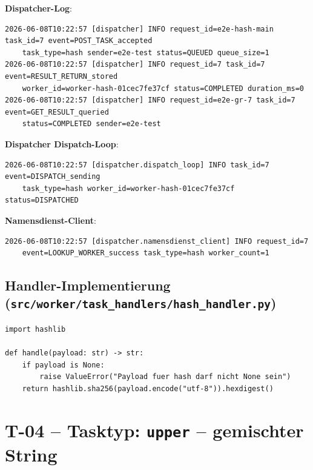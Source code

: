 \documentclass[a4paper,12pt]{article}
\begin{document}
\textbf{Dispatcher-Log}:
\begin{lstlisting}[style=log]
2026-06-08T10:22:57 [dispatcher] INFO request_id=e2e-hash-main task_id=7 event=POST_TASK_accepted
    task_type=hash sender=e2e-test status=QUEUED queue_size=1
2026-06-08T10:22:57 [dispatcher] INFO request_id=7 task_id=7 event=RESULT_RETURN_stored
    worker_id=worker-hash-01cec7fe37cf status=COMPLETED duration_ms=0
2026-06-08T10:22:57 [dispatcher] INFO request_id=e2e-gr-7 task_id=7 event=GET_RESULT_queried
    status=COMPLETED sender=e2e-test
\end{lstlisting}

\textbf{Dispatcher Dispatch-Loop}:
\begin{lstlisting}[style=log]
2026-06-08T10:22:57 [dispatcher.dispatch_loop] INFO task_id=7 event=DISPATCH_sending
    task_type=hash worker_id=worker-hash-01cec7fe37cf status=DISPATCHED
\end{lstlisting}

\textbf{Namensdienst-Client}:
\begin{lstlisting}[style=log]
2026-06-08T10:22:57 [dispatcher.namensdienst_client] INFO request_id=7
    event=LOOKUP_WORKER_success task_type=hash worker_count=1
\end{lstlisting}

\subsection*{Handler-Implementierung (\texttt{src/worker/task\_handlers/hash\_handler.py})}

\begin{lstlisting}[style=python]
import hashlib

def handle(payload: str) -> str:
    if payload is None:
        raise ValueError("Payload fuer hash darf nicht None sein")
    return hashlib.sha256(payload.encode("utf-8")).hexdigest()
\end{lstlisting}

\newpage
\section*{T-04 -- Tasktyp: \texttt{upper} -- gemischter String}
\end{document}

